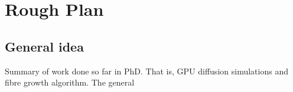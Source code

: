 \chapter{Rough Plan	}
\label{sec:plan}

\section{General idea}
Summary of work done so far in PhD. That is, GPU diffusion simulations and fibre growth algorithm. 
The general 
